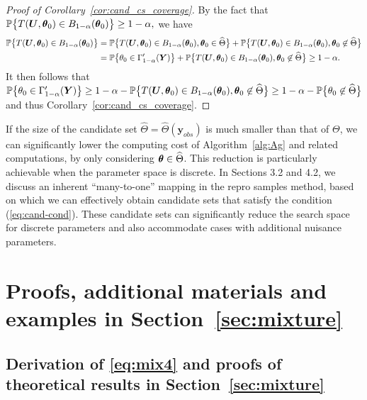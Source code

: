 \documentclass[12pt]{article}
\theoremstyle{shortspace}
\def\*#1{\bm{#1}}
\def\btheta{\mathop{\theta\kern-.45em\hbox{$\theta$}}\nolimits}
\def\P{\mathbb P}
\begin{document}
\begin{proof}[Proof of Corollary~\ref{cor:cand_cs_coverage}] 
By the fact that $\P\big\{T(\*U, \btheta_0) \in B_{1 - \alpha}(\btheta_0)\big\} \geq 1 - \alpha,$ we have 
\begin{align*}
   \P\big\{T(\*U, \btheta_0) \in B_{1 - \alpha}(\btheta_0)\big\} &  = \P\big\{T(\*U,\btheta_0) \in B_{1 - \alpha}(\btheta_0), \btheta_0 \in \widehat\Theta\big\} +  \P\big\{T(\*U,\btheta_0) \in B_{1 - \alpha}(\btheta_0), \btheta_0 \not\in \widehat\Theta\big\}  \\
   &  = \P\big\{\theta_0 \in \Gamma_{1-\alpha}'(\*Y)\big\} +  \P\big\{T(\*U,\btheta_0) \in B_{1 - \alpha}(\btheta_0), \btheta_0 \not\in \widehat\Theta\big\} \geq 1- \alpha.
\end{align*}
It then follows that
   $\P\big\{\theta_0 \in \Gamma_{1-\alpha}'(\*Y) \big\} \geq 1 - \alpha - \P\big\{T(\*U,\btheta_0) \in B_{1 - \alpha}(\btheta_0), \btheta_0 \not\in \widehat\Theta\big\} \geq 1 - \alpha - \P\big\{\theta_0 \not\in \widehat\Theta\big\}$
and thus Corollary~\ref{cor:cand_cs_coverage}.
\end{proof} 


If the size of the candidate set $\widehat \Theta =  \widehat \Theta(\*y_{obs})$ is much smaller than that of $\Theta$, we can significantly lower the computing cost of Algorithm~\ref{alg:Ag} and related computations, by only considering $\btheta \in \widehat \Theta$. This reduction is particularly achievable when the parameter space is discrete. In Sections 3.2 and 4.2, we discuss an inherent ``many-to-one'' mapping in the repro samples method, based on which we can effectively obtain candidate sets that satisfy the condition (\ref{eq:cand-cond}).
These candidate sets can significantly reduce the search space for discrete parameters and also accommodate cases with additional nuisance parameters.  




\section{Proofs, additional materials and examples in Section~\ref{sec:mixture}}\label{sec:appendix_mixture}
\subsection{Derivation of \eqref{eq:mix4} and proofs of theoretical results in Section~\ref{sec:mixture} }\label{sec:proof_sec4}
\end{document}
